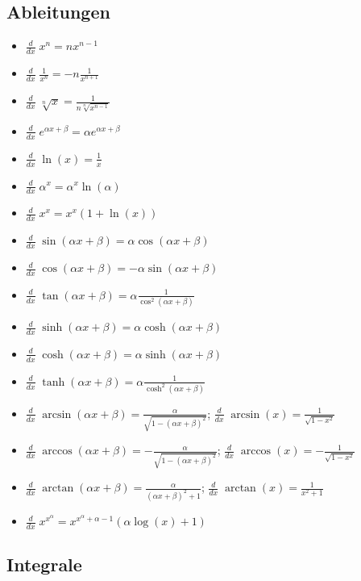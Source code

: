 \subsection{Ableitungen}
\begin{itemize}[leftmargin=*]
	\item $\frac{d}{dx}\; x^n = nx^{n-1}$
	\item $\frac{d}{dx}\; \frac{1}{x^n} = -n \frac{1}{x^{n+1}}$
	\item $\frac{d}{dx}\; \sqrt[n]{x} = \frac{1}{n\sqrt[n]{x^{n-1}}}$
	\item $\frac{d}{dx}\; e^{\alpha x + \beta} = \alpha e^{\alpha x + \beta}$
	\item $\frac{d}{dx}\; \ln(x) = \frac{1}{x}$
	\item $\frac{d}{dx}\; \alpha^x = \alpha^x \ln(\alpha)$
	\item $\frac{d}{dx}\; x^x = x^x (1 + \ln(x))$
	\item $\frac{d}{dx}\; \sin(\alpha x + \beta) = \alpha \cos(\alpha x + \beta)$
	\item $\frac{d}{dx}\; \cos(\alpha x + \beta) = -\alpha \sin(\alpha x + \beta)$
	\item $\frac{d}{dx}\; \tan(\alpha x + \beta) = \alpha \frac{1}{\cos^2(\alpha x
	+ \beta)}$
	\item $\frac{d}{dx}\; \sinh(\alpha x + \beta) = \alpha \cosh(\alpha x + \beta)$
	\item $\frac{d}{dx}\; \cosh(\alpha x + \beta) = \alpha \sinh(\alpha x + \beta)$
	\item $\frac{d}{dx}\; \tanh(\alpha x + \beta) = \alpha
	\frac{1}{\cosh^2(\alpha x + \beta)}$
	\item $\frac{d}{dx}\; \arcsin(\alpha x + \beta) =
	\frac{\alpha}{\sqrt{1-(\alpha x + \beta)^2}}$;  
		$\frac{d}{dx}\; \arcsin(x) = \frac{1}{\sqrt{1-x^2}}$
	\item $\frac{d}{dx}\; \arccos(\alpha x + \beta) = -\frac{\alpha}{\sqrt{1 -
	(\alpha x + \beta)^2}}$;
		$\frac{d}{dx}\; \arccos(x) = -\frac{1}{\sqrt{1-x^2}}$
	\item $\frac{d}{dx}\; \arctan(\alpha x + \beta) = \frac{\alpha}{(\alpha x +
	\beta)^2 + 1}$; 
		$\frac{d}{dx}\; \arctan(x) = \frac{1}{x^2+1}$
	\item $\frac{d}{dx}\; x^{x^\alpha} = x^{x^\alpha + \alpha - 1} (\alpha
	\log(x) + 1)$
\end{itemize}

\subsection{Integrale}
